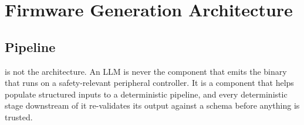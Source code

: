 \section{Firmware Generation Architecture}
\label{sec:firmware-generation}

\subsection{Pipeline}

\begin{decision}[title={Explicitly rejected approach}]
 is not the architecture. An LLM is never the component that emits the binary that runs on a safety-relevant peripheral controller. It is a component that helps populate structured inputs to a deterministic pipeline, and every deterministic stage downstream of it re-validates its output against a schema before anything is trusted.
\end{decision}

